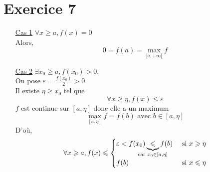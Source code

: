 \part{Exercice 7}


\begin{itemize}
	\item[\underline{\sc Cas 1}] $\forall x \ge a, f(x) = 0$\\
		Alors, \[
			0 = f(a) = \max_{[a,+\infty[}f
		\]
	\item[\underline{\sc Cas 2}] $\exists x_0 \ge a, f(x_0) > 0$.\\
		On pose $\varepsilon = \frac{f(x_0)}{2}>0$ \\
		Il existe $\eta \ge x_0$ tel que \[
			\forall x \ge \eta, f(x) \le \varepsilon
		\] $f$ est continue sur $[a,\eta]$ donc elle a un maximum \[
			\max_{[a,\eta]}f = f(b) \text{ avec } b \in [a,\eta]
		\]
		D'où, \[
			\forall x \ge a, f(x) \le \begin{cases}
				\varepsilon < f(x_0) \underbrace{\le}_{\mathclap{\text{car } x_0 \in [a,\eta]}} f(b) & \text{ si } x \ge \eta\\
				f(b) &\text{ si } x \le \eta
			\end{cases}
		\]
\end{itemize}
